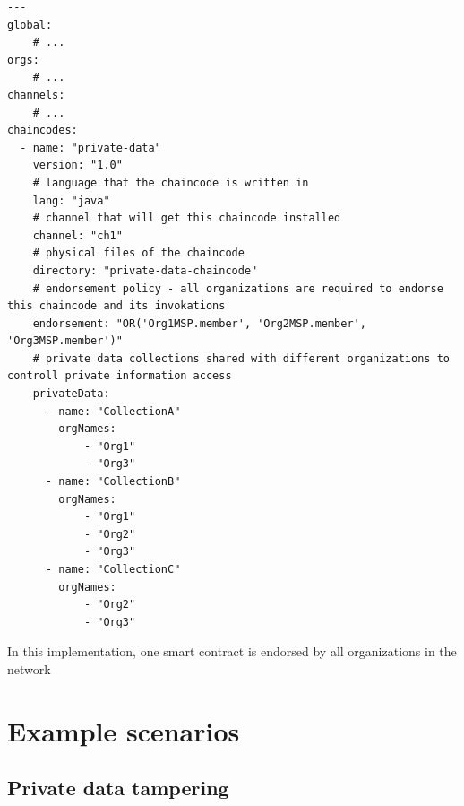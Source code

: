 \documentclass[12pt]{article}
\begin{document}
    \newpage
    \begin{lstlisting}[style=yaml,
        caption={fablo.yaml - configuration file defining network chaincode}, label={lst:chaincode}]
---
global:
    # ...
orgs:
    # ...
channels:
    # ...
chaincodes:
  - name: "private-data"
    version: "1.0"
    # language that the chaincode is written in
    lang: "java"
    # channel that will get this chaincode installed
    channel: "ch1"
    # physical files of the chaincode
    directory: "private-data-chaincode"
    # endorsement policy - all organizations are required to endorse this chaincode and its invokations
    endorsement: "OR('Org1MSP.member', 'Org2MSP.member', 'Org3MSP.member')"
    # private data collections shared with different organizations to controll private information access
    privateData:
      - name: "CollectionA"
        orgNames:
            - "Org1"
            - "Org3"
      - name: "CollectionB"
        orgNames:
            - "Org1"
            - "Org2"
            - "Org3"
      - name: "CollectionC"
        orgNames:
            - "Org2"
            - "Org3"
    \end{lstlisting}


    In this implementation, one smart contract is endorsed by all organizations in the network




    \section{Example scenarios}
    \label{sec:scenarios}


    \subsection{Private data tampering}




    
    
    \newpage
    
    
\end{document}
